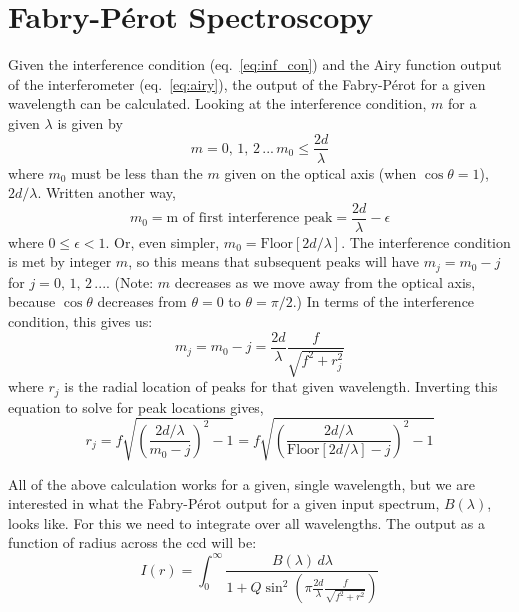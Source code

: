 \documentclass{article}
\begin{document}
\section{Fabry-P\'{e}rot Spectroscopy}
Given the interference condition (eq.~\ref{eq:inf_con}) and the Airy function output of the interferometer (eq.~\ref{eq:airy}), the output of the Fabry-P\'{e}rot for a given wavelength can be calculated. Looking at the interference condition, $m$ for a given $\lambda$ is given by 
\begin{equation}
m = 0,\,1,\,2\,...\,m_{0}\leq\frac{2d}{\lambda}
\end{equation}
where $m_{0}$ must be less than the $m$ given on the optical axis (when $\cos{\theta}=1$), $2d/\lambda$. Written another way,
\begin{equation}
m_{0} = \text{m of first interference peak} = \frac{2d}{\lambda} - \epsilon
\end{equation}
where $0\leq\epsilon<1$. Or, even simpler, $m_{0}=\text{Floor}[2d/\lambda]$. The interference condition is met by integer $m$, so this means that subsequent peaks will have $m_{j}=m_{0}-j$ for $j=0,\,1,\,2\,...$. (Note: $m$ decreases as we move away from the optical axis, because $\cos{\theta}$ decreases from $\theta=0$ to $\theta=\pi/2$.) In terms of the interference condition, this gives us:
\begin{equation}
m_{j}=m_{0}-j =\frac{2d}{\lambda}\frac{f}{\sqrt{f^{2}+r_{j}^{2}}}
\label{eq:mj}
\end{equation}
where $r_{j}$ is the radial location of peaks for that given wavelength. Inverting this equation to solve for peak locations gives,
\begin{equation}
r_{j} = f\sqrt{\left(\frac{2d/\lambda}{m_{0}-j}\right)^{2}-1}=f\sqrt{\left(\frac{2d/\lambda}{\text{Floor}[2d/\lambda]-j}\right)^{2}-1}
\end{equation}

All of the above calculation works for a given, single wavelength, but we are interested in what the Fabry-P\'{e}rot output for a given input spectrum, $B(\lambda)$, looks like. For this we need to integrate over all wavelengths. The output as a function of radius across the ccd will be:
\begin{equation}
I(r) = \int_{0}^{\infty} \frac{B(\lambda)\,d\lambda}{1+Q\sin^{2}{\left(\pi \frac{2d}{\lambda}\frac{f}{\sqrt{f^{2}+r^{2}}}\right)}}
\label{eq:pattern}
\end{equation}
\end{document}
